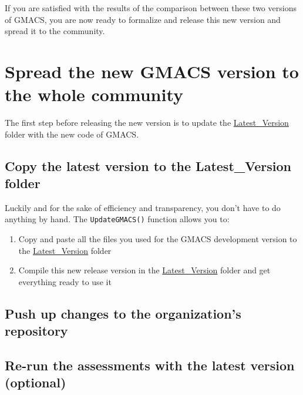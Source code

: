 \documentclass[
]{article}
\providecommand{\tightlist}{%
  \setlength{\itemsep}{0pt}\setlength{\parskip}{0pt}}
\begin{document}
If you are satisfied with the results of the comparison between these
two versions of GMACS, you are now ready to formalize and release this
new version and spread it to the community.

\hypertarget{spread-the-new-gmacs-version-to-the-whole-community}{%
\section{Spread the new GMACS version to the whole
community}\label{spread-the-new-gmacs-version-to-the-whole-community}}

The first step before releasing the new version is to update the
\href{https://github.com/GMACS-project/GMACS_Assessment_code/tree/main/GMACS/Latest_Version}{Latest\_Version}
folder with the new code of GMACS.

\hypertarget{copy-the-latest-version-to-the-latest_version-folder}{%
\subsection{Copy the latest version to the Latest\_Version
folder}\label{copy-the-latest-version-to-the-latest_version-folder}}

Luckily and for the sake of efficiency and transparency, you don't have
to do anything by hand. The \texttt{UpdateGMACS()} function allows you
to:

\begin{enumerate}
\def\labelenumi{\roman{enumi})}
\tightlist
\item
  Copy and paste all the files you used for the GMACS development
  version to the
  \href{https://github.com/GMACS-project/GMACS_Assessment_code/tree/main/GMACS/Latest_Version}{Latest\_Version}
  folder
\item
  Compile this new release version in the
  \href{https://github.com/GMACS-project/GMACS_Assessment_code/tree/main/GMACS/Latest_Version}{Latest\_Version}
  folder and get everything ready to use it
\end{enumerate}

\hypertarget{push-up-changes-to-the-organizations-repository}{%
\subsection{Push up changes to the organization's
repository}\label{push-up-changes-to-the-organizations-repository}}

\hypertarget{re-run-the-assessments-with-the-latest-version-optional}{%
\subsection{Re-run the assessments with the latest version
(optional)}\label{re-run-the-assessments-with-the-latest-version-optional}}
\end{document}
